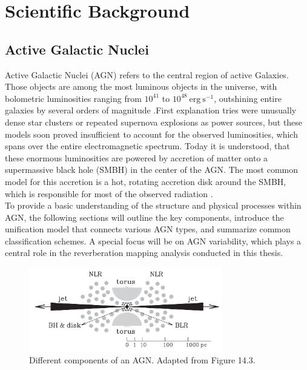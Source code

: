 \chapter{Scientific Background}
\label{chap:scientific_background}

\section{Active Galactic Nuclei}
\label{sec:agn}

Active Galactic Nuclei (AGN) refers to the central region of active Galaxies. Those objects are among the most luminous objects in the universe, with bolometric luminosities ranging from $10^{41}$ to $10^{48} \ \mathrm{erg \ s^{-1}}$, outshining entire galaxies by several orders of magnitude \parencite{peterson1997introduction}.First explanation tries were unusually dense star clusters or repeated supernova explosions as power sources, but these models soon proved insufficient to account for the observed luminosities, which spans over the entire electromagnetic spectrum. Today it is understood, that these enormous luminosities are powered by accretion of matter onto a supermassive black hole (SMBH) in the center of the AGN. The most common model for this accretion is a hot, rotating accretion disk around the SMBH, which is responsible for most of the observed radiation \parencite{shakura1973black}.\\
To provide a basic understanding of the structure and physical processes within AGN, the following sections will outline the key components, introduce the unification model that connects various AGN types, and summarize common classification schemes. A special focus will be on AGN variability, which plays a central role in the reverberation mapping analysis conducted in this thesis.



\begin{figure}[!ht]
	\centering
	\includegraphics[width=0.75\textwidth]{pictures/Chapter2/AGN_standard_paradigm.png}
	\caption{Different components of an AGN. Adapted from \textcite{mo2010galaxy} Figure 14.3.}
	\label{fig:agn_structure_mo}
\end{figure}


